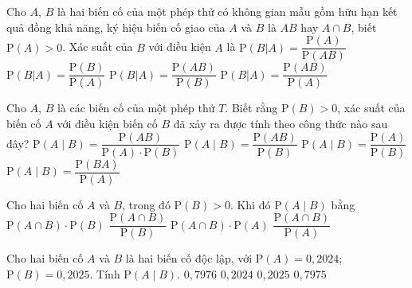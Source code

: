 \begin{ex}%
	Cho $A$, $B$ là hai biến  cố của một phép thử có không gian mẫu gồm hữu hạn kết quả đồng khả năng, ký hiệu biến cố giao của $A$ và $B$ là $AB$ hay $A\cap B$, biết $\mathrm{P}(A)>0$. Xác suất của $B$ với điều kiện $A$ là
	 \choice
		 {$\mathrm{P}(B|A)=\dfrac{\mathrm{P}(A)}{\mathrm{P}(AB)}$}
		 {$\mathrm{P}(B|A)=\dfrac{\mathrm{P}(B)}{\mathrm{P}(A)}$}
		{$\mathrm{P}(B|A)=\dfrac{\mathrm{P}(AB)}{\mathrm{P}(B)}$} 
		 {\True $\mathrm{P}(B|A)=\dfrac{\mathrm{P}(AB)}{\mathrm{P}(A)}$}
\end{ex}

\begin{ex}%
	Cho $A$, $B$  là các biến cố của một phép thử $T$. Biết rằng $\mathrm{P}(B)>0$, xác suất của biến cố $A$ với điều kiện biến cố $B$ đã xảy ra được tính theo công thức nào sau đây?
	 \choice
		{$\mathrm{P}(A \mid B)=\dfrac{\mathrm{P}(AB)}{\mathrm{P}(A)  \cdot \mathrm{P}(B)}$}
		 {\True $\mathrm{P}(A \mid B)=\dfrac{\mathrm{P}(AB)}{\mathrm{P}(B)}$}
		{$\mathrm{P}(A \mid  B)=\dfrac{\mathrm{P}(A)}{\mathrm{P}(B)}$}
		{$\mathrm{P}(A  \mid B)=\dfrac{\mathrm{P}(BA)}{\mathrm{P}(A)}$}
\end{ex}

\begin{ex}%
	Cho hai biến cố $A$ và $B$, trong đó $\mathrm{P}(B)>0$. Khi đó  $\mathrm{P}(A\mid B)$ bằng
	 \choice
		{$\mathrm{P}(A\cap B) \cdot  \mathrm{P}(B)$}
		{\True  $\dfrac{\mathrm{P}(A\cap B)}{\mathrm{P}(B)}$}
		{$\mathrm{P}(A\cap  B)\cdot \mathrm{P}(A)$}
		{$\dfrac{\mathrm{P}(A\cap B)}{\mathrm{P}(A)}$} 
\end{ex}

\begin{ex}%
	Cho hai biến cố $A$ và $B$ là hai biến cố độc lập, với  $\mathrm{P}(A)=0{,}2024$; $\mathrm{P}(B)=0{,}2025$. Tính $\mathrm{P}\left(A\mid B\right)$.
	\choice 
		 {$0{,}7976$}
		{\True  $0{,}2024$}
		{$0{,}2025$} 
		{$0{,}7975$} 
\end{ex}

